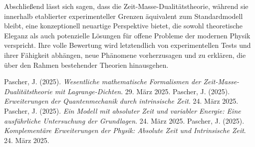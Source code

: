 \documentclass[a4paper,12pt]{article}
\begin{document}
	Abschließend lässt sich sagen, dass die Zeit-Masse-Dualitätstheorie, während sie innerhalb etablierter experimenteller Grenzen äquivalent zum Standardmodell bleibt, eine konzeptionell neuartige Perspektive bietet, die sowohl theoretische Eleganz als auch potenzielle Lösungen für offene Probleme der modernen Physik verspricht. Ihre volle Bewertung wird letztendlich von experimentellen Tests und ihrer Fähigkeit abhängen, neue Phänomene vorherzusagen und zu erklären, die über den Rahmen bestehender Theorien hinausgehen.
	
	
	\begin{thebibliography}{9}
		 Pascher, J. (2025). \textit{Wesentliche mathematische Formalismen der Zeit-Masse-Dualitätstheorie mit Lagrange-Dichten}. 29. März 2025.
		 Pascher, J. (2025). \textit{Erweiterungen der Quantenmechanik durch intrinsische Zeit}. 24. März 2025.
		 Pascher, J. (2025). \textit{Ein Modell mit absoluter Zeit und variabler Energie: Eine ausführliche Untersuchung der Grundlagen}. 24. März 2025.
		 Pascher, J. (2025). \textit{Komplementäre Erweiterungen der Physik: Absolute Zeit und Intrinsische Zeit}. 24. März 2025.
	\end{thebibliography}
	
\end{document}
